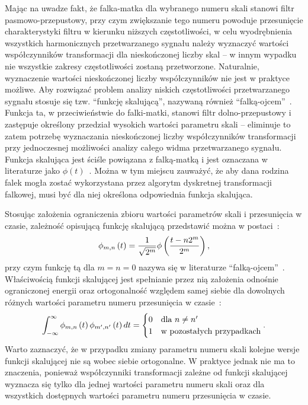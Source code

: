 Mając na uwadze fakt, że falka-matka dla wybranego numeru skali stanowi filtr pasmowo-przepustowy, przy czym zwiększanie tego numeru powoduje przesunięcie charakterystyki filtru w kierunku niższych częstotliwości, w celu wyodrębnienia wszystkich harmonicznych przetwarzanego sygnału należy wyznaczyć wartości współczynników transformacji dla nieskończonej liczby skal -- w innym wypadku nie wszystkie zakresy częstotliwości zostaną przetworzone. Naturalnie, wyznaczenie wartości nieskończonej liczby współczynników nie jest w praktyce możliwe. Aby rozwiązać problem analizy niskich częstotliwości przetwarzanego sygnału stosuje się tzw. \enquote{funkcję skalującą}, nazywaną również \enquote{falką-ojcem}~\cite{shensa_dwt}. Funkcja ta, w przeciwieństwie do falki-matki, stanowi filtr dolno-przepustowy i zastępuje określony przedział wysokich wartości parametru skali -- eliminuje to zatem potrzebę wyznaczania nieskończonej liczby współczynników transformacji przy jednoczesnej możliwości analizy całego widma przetwarzanego sygnału. Funkcja skalująca jest ściśle powiązana z falką-matką i jest oznaczana w literaturze jako $\phi(t)$~\cite{wallen_handbook}. Można w tym miejscu zauważyć, że aby dana rodzina falek mogła zostać wykorzystana przez algorytm dyskretnej transformacji falkowej, musi być dla niej określona odpowiednia funkcja skalująca.

Stosując założenia ograniczenia zbioru wartości parametrów skali i przesunięcia w czasie, zależność opisującą funkcję skalującą przedstawić można w postaci~\cite{ahmad_wavelet}:
\begin{equation}
\phi_{m,n} \left(t\right) = \frac{1}{\sqrt{2^{m}}} \phi \left(\frac{t - n 2^{m}}{2^{m}}\right) \label{eq:dwt_scalefun},
\end{equation}
przy czym funkcję tą dla $m = n = 0$ nazywa się w literaturze \enquote{falką-ojcem}~\cite{akujuobi_applications}. Właściwością funkcji skalującej jest spełnianie przez nią założenia odnośnie ograniczonej energii oraz ortogonalność względem samej siebie dla dowolnych różnych wartości parametru numeru przesunięcia w czasie~\cite{ahmad_wavelet}:
\begin{equation}
\int _{-\infty} ^{\infty} \phi_{m,n} \emb{t} \phi_{m',n'} \emb{t} dt =
\begin{cases}
	0 & $dla $ n \ne n' \\
	1 & $w pozostałych przypadkach$
\end{cases}
\label{eq:dwt_orthogonal_father}.
\end{equation}
Warto zaznaczyć, że w przypadku zmiany parametru numeru skali kolejne wersje funkcji skalującej nie są wobec siebie ortogonalne. W praktyce jednak nie ma to znaczenia, ponieważ współczynniki transformacji zależne od funkcji skalującej wyznacza się tylko dla jednej wartości parametru numeru skali oraz dla wszystkich dostępnych wartości parametru numeru przesunięcia w czasie.

